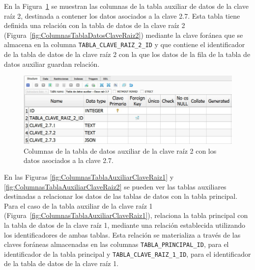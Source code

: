 En la Figura~\ref{fig:ColumnasTablaDatosAuxiliarClaveRaiz2} se muestran las columnas de la tabla auxiliar de datos de la clave raíz 2, destinada a contener los datos asociados a la clave 2.7. 
Esta tabla tiene definida una relación con la tabla de datos de la clave raíz 2 (Figura~\ref{fig:ColumnasTablaDatosClaveRaiz2}) mediante la clave foránea que se almacena en la columna \texttt{TABLA\_CLAVE\_RAIZ\_2\_ID} y que contiene el identificador de la tabla de datos de la clave raíz 2 con la que los datos de la fila de la tabla de datos auxiliar guardan relación.

\begin{figure}[H]
\centering
\includegraphics[width=.9\textwidth]{fig/Base de datos estructura/Columnas tabla de datos auxiliar clave raiz 2.png}
\caption{Columnas de la tabla de datos auxiliar de la clave raíz 2 con los datos asociados a la clave 2.7.}
\label{fig:ColumnasTablaDatosAuxiliarClaveRaiz2}
\end{figure}

En las Figuras \ref{fig:ColumnasTablaAuxiliarClaveRaiz1} y \ref{fig:ColumnasTablaAuxiliarClaveRaiz2} se pueden ver las tablas auxiliares destinadas a relacionar los datos de las tablas de datos con la tabla principal. Para el caso de la tabla auxiliar de la clave raíz 1 (Figura~\ref{fig:ColumnasTablaAuxiliarClaveRaiz1}), relaciona la tabla principal con la tabla de datos de la clave raíz 1, mediante una relación establecida utilizando los identificadores de ambas tablas. Esta relación se materializa a través de las claves foráneas almacenadas en las columnas \texttt{TABLA\_PRINCIPAL\_ID}, para el identificador de la tabla principal y \texttt{TABLA\_CLAVE\_RAIZ\_1\_ID}, para el identificador de la tabla de datos de la clave raíz 1.

